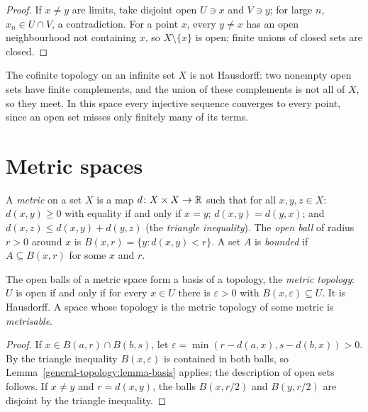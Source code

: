 \begin{proof}
If $x \neq y$ are limits, take disjoint open $U \ni x$ and $V \ni y$; for large $n$, $x_n \in U \cap V$, a contradiction. For a point $x$, every
$y \neq x$ has an open neighbourhood not containing $x$, so $X \setminus \{x\}$ is open; finite unions of closed sets are closed.
\end{proof}

\begin{counterexample}\label{general-topology:counterexample-cofinite-not-hausdorff}
The cofinite topology on an infinite set $X$ is not Hausdorff: two nonempty open sets have finite complements, and the union of
these complements is not all of $X$, so they meet. In this space every injective sequence converges to every point, since an open set
misses only finitely many of its terms.
\end{counterexample}

\section{Metric spaces}\label{general-topology:section-metric}

\begin{definition}\label{general-topology:definition-metric}
A \emph{metric} on a set $X$ is a map $d \colon X \times X \to \mathbb{R}$ such that for all $x, y, z \in X$: $d(x, y) \geq 0$ with equality if and
only if $x = y$; $d(x, y) = d(y, x)$; and $d(x, z) \leq d(x, y) + d(y, z)$ (the \emph{triangle inequality}). The \emph{open ball} of radius
$r > 0$ around $x$ is $B(x, r) = \{y : d(x, y) < r\}$. A set $A$ is \emph{bounded} if $A \subseteq B(x, r)$ for some $x$ and $r$.
\end{definition}

\begin{lemma}\label{general-topology:lemma-metric-topology}
The open balls of a metric space form a basis of a topology, the \emph{metric topology}: $U$ is open if and only if for every $x \in U$
there is $\varepsilon > 0$ with $B(x, \varepsilon) \subseteq U$. It is Hausdorff. A space whose topology is the metric topology of some metric
is \emph{metrisable}.
\end{lemma}

\begin{proof}
If $x \in B(a, r) \cap B(b, s)$, let $\varepsilon = \min(r - d(a, x), s - d(b, x)) > 0$. By the triangle inequality $B(x, \varepsilon)$ is contained in
both balls, so Lemma~\ref{general-topology:lemma-basis} applies; the description of open sets follows. If $x \neq y$ and
$r = d(x, y)$, the balls $B(x, r/2)$ and $B(y, r/2)$ are disjoint by the triangle inequality.
\end{proof}

